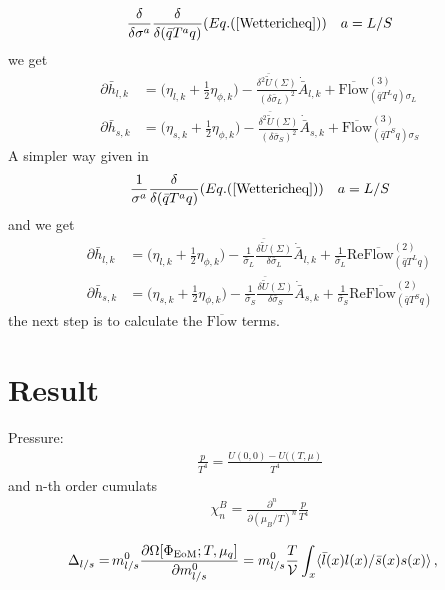 \documentclass[12pt]{article}
\begin{document}
\begin{align}
\frac{{\delta}}{\delta \sigma^a}\frac{{\delta}}{\delta(\bar q T^a q)}(Eq. (\ref{Wettericheq})) \quad a=L/S
\end{align}
we get
\begin{align}
\partial \bar h_{l,k}&=\bigg( \eta_{l,k} +\frac{1}{2}\eta_{\phi,k}\bigg )-\frac{\delta^2 \bar {\tilde U}(\Sigma)}{(\delta \bar \sigma_L)^2}\dot{\bar A}_{l,k}+\overline{  \text{Flow} }_{(\bar q T^L q) \sigma_L}^{(3)}\\
\partial \bar h_{s,k}&=\bigg( \eta_{s,k} +\frac{1}{2}\eta_{\phi,k}\bigg )-\frac{\delta^2 \bar {\tilde U}(\Sigma)}{(\delta \bar \sigma_S)^2}\dot{\bar A}_{s,k}+\overline{  \text{Flow} }_{(\bar q T^S q) \sigma_S}^{(3)}
\end{align}
A simpler way given in \cite{}
\begin{align}
\frac{{1}}{\sigma^a}\frac{{\delta}}{\delta(\bar q T^a q)}(Eq. (\ref{Wettericheq})) \quad a=L/S
\end{align}
and we get
\begin{align}
\partial \bar h_{l,k}&=\bigg( \eta_{l,k} +\frac{1}{2}\eta_{\phi,k}\bigg )-\frac{1}{\bar \sigma_L} \frac{\delta \bar{\tilde U}(\Sigma)}{\delta \bar \sigma_L}\dot{\bar A}_{l,k}+\frac{1}{\bar \sigma_L} \text{Re} \overline{  \text{Flow} }_{(\bar q T^L q)}^{(2)}\\
\partial \bar h_{s,k}&=\bigg( \eta_{s,k} +\frac{1}{2}\eta_{\phi,k}\bigg )-\frac{1}{\bar \sigma_S} \frac{\delta \bar{\tilde U}(\Sigma)}{\delta \bar \sigma_S}\dot{\bar A}_{s,k}+\frac{1}{\bar \sigma_S} \text{Re} \overline{  \text{Flow} }_{(\bar q T^S q)}^{(2)} \label{Yukawa_eq}
\end{align}
the next step is to calculate the $\overline{\text{Flow}}$ terms.

\section{Result}
Pressure:
\begin{align}
\frac{p}{T^4}=\frac{U(0,0)-U((T,\mu)}{T^4}
\end{align}
and  n-th order cumulats
\begin{align}
\chi^B_n=\frac{\partial^n}{\partial (\mu_B/T)^n}\frac{p}{T^4}
\end{align}

\begin{align}
  \Delta_{l/s} =
  &\,  m_{l/s}^0\frac{\partial
    \Omega[\Phi_{\textrm{EoM}};T,\mu_q]}{\partial {m^0_{l/s}}}=
    m_{l/s}^0  \frac{T}{\cal V} \int_x \langle \bar l(x) l(x) / \bar s(x) s(x) \rangle\,,
                 \label{eq:chiralcond}
\end{align} 
\end{document}
